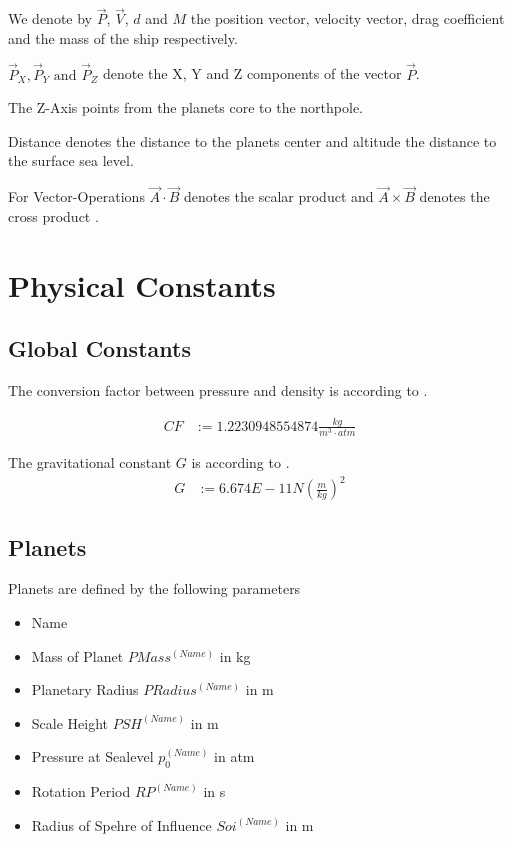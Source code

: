 \documentclass[11pt]{article}
\newcommand{\oa}[1]{\overrightarrow{#1}}
\newcommand{\Pos}{\oa{P}}
\newcommand{\Vel}{\oa{V}}
\begin{document}
We denote by $\Pos$, $\Vel$, $d$ and $M$ the 
position vector,  velocity vector, drag
coefficient and the mass of the ship respectively.

$\Pos_X, \Pos_Y \textrm{ and } \Pos_Z$ denote the X, Y and Z
components of the vector $\Pos$.

The Z-Axis points from the planets core to the northpole.

Distance denotes the distance to the planets center and altitude the
distance to the surface sea level.

For Vector-Operations $\oa{A} \cdot \oa{B}$ denotes the scalar product \cite{ScalarProduct} and $\oa{A} \times \oa{B}$ denotes the cross product \cite{CrossProduct}.

\section{Physical Constants}

\subsection{Global Constants}

The  conversion factor between pressure and
density is according to \cite{Atmo}.

\begin{align}
  CF &:= 1.2230948554874 \frac{kg}{m^3\cdot atm}
\end{align}

The  gravitational constant $G$ is according to \cite{ACB}.
\begin{align}
  G &:= 6.674E-11 N\left(\frac{m}{kg}\right)^2
\end{align}

\subsection{Planets}

Planets are defined by the following parameters

\begin{itemize}
\item Name
\item {} Mass of Planet $PMass^{(Name)}$ in kg
\item {} Planetary Radius $PRadius^{(Name)}$ in m
\item {} Scale Height $PSH^{(Name)}$ in m
\item {} Pressure at Sealevel $p_0^{(Name)}$ in atm
\item {} Rotation Period $RP^{(Name)}$ in s
\item {} Radius of Spehre of Influence $Soi^{(Name)}$ in m
\end{itemize}
\end{document}
